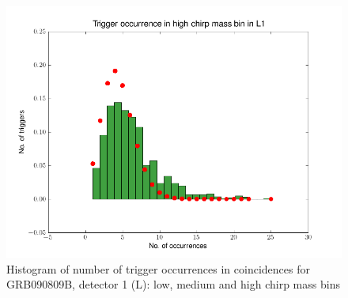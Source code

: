 \documentclass[epsf]{article}
\begin{document}
\begin{figure}[ht!]
\begin{minipage}[b]{0.5\linewidth}
\centering
\includegraphics[scale=0.45]{l1_high_distribution.png}
\end{minipage}
\caption{Histogram of number of trigger occurrences in coincidences for GRB090809B, detector 1 (L): low, medium and high chirp mass bins}
\label{poissonL}
\end{figure}
\end{document}
